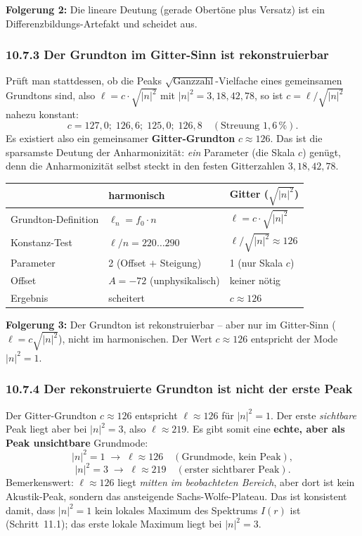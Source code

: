 \textbf{Folgerung 2:} Die lineare Deutung (gerade Obertöne plus Versatz)
ist ein Differenzbildungs-Artefakt und scheidet aus.

\subsubsection*{10.7.3 Der Grundton im Gitter-Sinn ist rekonstruierbar}

Prüft man stattdessen, ob die Peaks $\sqrt{\text{Ganzzahl}}$-Vielfache
eines gemeinsamen Grundtons sind, also $\ell = c\cdot\sqrt{|n|^2}$ mit
$|n|^2 = 3, 18, 42, 78$, so ist $c = \ell/\sqrt{|n|^2}$ nahezu konstant:
\[
  c = 127{,}0;\; 126{,}6;\; 125{,}0;\; 126{,}8
  \quad(\text{Streuung } 1{,}6\,\%).
\]
Es existiert also ein gemeinsamer \textbf{Gitter-Grundton}
$c \approx 126$. Das ist die sparsamste Deutung der Anharmonizität:
\emph{ein} Parameter (die Skala $c$) genügt, denn die Anharmonizität selbst
steckt in den festen Gitterzahlen $3, 18, 42, 78$.

\begin{center}
\begin{tabular}{p{4.5cm}p{3.5cm}p{3.5cm}}
\toprule
 & \textbf{harmonisch} & \textbf{Gitter ($\sqrt{|n|^2}$)} \\
\midrule
Grundton-Definition & $\ell_n = f_0\cdot n$ & $\ell = c\cdot\sqrt{|n|^2}$ \\
Konstanz-Test & $\ell/n = 220\ldots290$ & $\ell/\sqrt{|n|^2} \approx 126$ \\
Parameter & 2 (Offset $+$ Steigung) & 1 (nur Skala $c$) \\
Offset & $A = -72$ (unphysikalisch) & keiner nötig \\
Ergebnis & scheitert & $c \approx 126$ \\
\bottomrule
\end{tabular}
\end{center}

\textbf{Folgerung 3:} Der Grundton ist rekonstruierbar -- aber nur im
Gitter-Sinn ($\ell = c\sqrt{|n|^2}$), nicht im harmonischen. Der Wert
$c \approx 126$ entspricht der Mode $|n|^2 = 1$.

\subsubsection*{10.7.4 Der rekonstruierte Grundton ist nicht der erste Peak}

Der Gitter-Grundton $c \approx 126$ entspricht $\ell \approx 126$ für
$|n|^2 = 1$. Der erste \emph{sichtbare} Peak liegt aber bei
$|n|^2 = 3$, also $\ell \approx 219$. Es gibt somit eine \textbf{echte,
aber als Peak unsichtbare} Grundmode:
\[
  |n|^2 = 1 \;\to\; \ell \approx 126
  \quad(\text{Grundmode, kein Peak}),
\]
\[
  |n|^2 = 3 \;\to\; \ell \approx 219
  \quad(\text{erster sichtbarer Peak}).
\]
Bemerkenswert: $\ell \approx 126$ liegt \emph{mitten im beobachteten
Bereich}, aber dort ist kein Akustik-Peak, sondern das ansteigende
Sachs-Wolfe-Plateau. Das ist konsistent damit, dass $|n|^2=1$ kein
lokales Maximum des Spektrums $I(r)$ ist (Schritt~11.1); das erste lokale
Maximum liegt bei $|n|^2=3$.

